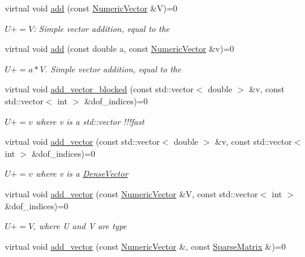 \begin{DoxyCompactItemize}
virtual void \mbox{\hyperlink{classfemus_1_1_numeric_vector_a6433358b382a0d0be3058336210d3bf2}{add}} (const \mbox{\hyperlink{classfemus_1_1_numeric_vector}{Numeric\+Vector}} \&V)=0
\begin{DoxyCompactList}\small\item\em $U+=V$\+: Simple vector addition, equal to the \end{DoxyCompactList}\item 
virtual void \mbox{\hyperlink{classfemus_1_1_numeric_vector_abff6f46504f6e04bd8cc36944697cc27}{add}} (const double a, const \mbox{\hyperlink{classfemus_1_1_numeric_vector}{Numeric\+Vector}} \&v)=0
\begin{DoxyCompactList}\small\item\em $U+=a*V$. Simple vector addition, equal to the \end{DoxyCompactList}\item 
virtual void \mbox{\hyperlink{classfemus_1_1_numeric_vector_a0440021963af01ac49a6f02df562e44b}{add\+\_\+vector\+\_\+blocked}} (const std\+::vector$<$ double $>$ \&v, const std\+::vector$<$ int $>$ \&dof\+\_\+indices)=0
\begin{DoxyCompactList}\small\item\em $ U+=v $ where {\ttfamily v} is a std\+::vector !!!fast \end{DoxyCompactList}\item 
virtual void \mbox{\hyperlink{classfemus_1_1_numeric_vector_a7189cbf63afd3adf254971ec36809c07}{add\+\_\+vector}} (const std\+::vector$<$ double $>$ \&v, const std\+::vector$<$ int $>$ \&dof\+\_\+indices)=0
\begin{DoxyCompactList}\small\item\em $ U+=v $ where v is a \mbox{\hyperlink{classfemus_1_1_dense_vector}{Dense\+Vector}} \end{DoxyCompactList}\item 
virtual void \mbox{\hyperlink{classfemus_1_1_numeric_vector_a4cb61447e41df8d24311a54a10a5b291}{add\+\_\+vector}} (const \mbox{\hyperlink{classfemus_1_1_numeric_vector}{Numeric\+Vector}} \&V, const std\+::vector$<$ int $>$ \&dof\+\_\+indices)=0
\begin{DoxyCompactList}\small\item\em $U+=V$, where U and V are type \end{DoxyCompactList}\item 
virtual void \mbox{\hyperlink{classfemus_1_1_numeric_vector_a279b5c283fc92dbaa2b1d09dbf70e231}{add\+\_\+vector}} (const \mbox{\hyperlink{classfemus_1_1_numeric_vector}{Numeric\+Vector}} \&, const \mbox{\hyperlink{classfemus_1_1_sparse_matrix}{Sparse\+Matrix}} \&)=0

\end{DoxyCompactItemize}
